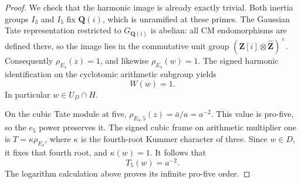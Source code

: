 \begin{proof}
We check that the harmonic image is already exactly
trivial.  Both inertia groups \(I_3\) and \(I_5\)
fix \(\mathbf Q(i)\), which is unramified at these
primes.  The Gaussian Tate representation restricted
to \(G_{\mathbf Q(i)}\) is abelian: all CM
endomorphisms are defined there, so the image lies in
the commutative unit group
\((\mathbf Z[i]\otimes\widehat{\mathbf Z})^\times\).
Consequently \(\rho_{E_4}(z)=1\), and likewise
\(\rho_{E_4}(w)=1\).  The signed harmonic identification
on the cyclotomic arithmetic subgroup yields
\[
                               W(w)=1.
\]
In particular \(w\in U_D\cap H\).

On the cubic Tate module at five,
\(\rho_{E_3,5}(z)=\bar a/a=a^{-2}\).
This value is pro-five, so the \(e_5\) power preserves it.
The signed cubic frame on arithmetic multiplier one
is \(T=\kappa\rho_{E_3}\), where
\(\kappa\) is the fourth-root Kummer character of
three.  Since \(w\in D\), it fixes that fourth root,
and \(\kappa(w)=1\).  It follows that
\[
                              T_5(w)=a^{-2}.
\]
The logarithm calculation above proves its infinite pro-five order.
\end{proof}
